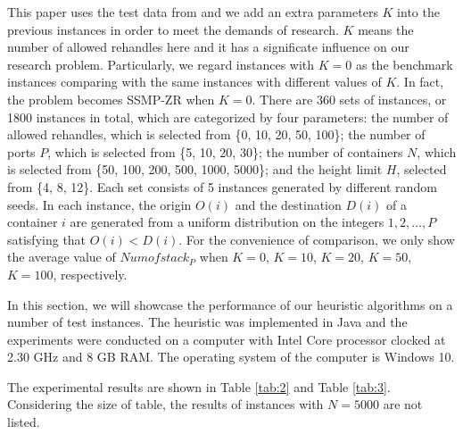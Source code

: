 \documentclass[review,3p,times,authoryear,12pt]{elsarticle}
\begin{document}
This paper uses the test data from \cite{wang2014stowage} and we add an extra parameters $K$ into the previous instances in order to meet the demands of research.
$K$ means the number of allowed rehandles here and it has a significate influence on our research problem.
Particularly, we regard instances with $K=0$ as the benchmark instances comparing with the same instances with different values of $K$.
In fact, the problem becomes SSMP-ZR when $K=0$.
There are 360 sets of instances, or 1800 instances in total, which are categorized by four parameters: the number of allowed rehandles, which is selected from \{0, 10, 20, 50, 100\};
the number of ports $P$, which is selected from \{5, 10, 20, 30\};
the number of containers $N$, which is selected from \{50, 100, 200, 500, 1000, 5000\};
and the height limit $H$, selected from \{4, 8, 12\}.
Each set consists of 5 instances generated by different random seeds.
In each instance, the origin $O(i)$ and the destination $D(i)$ of a container $i$ are generated from a uniform distribution on the integers $1, 2, \ldots, P$ satisfying that $O(i)<D(i)$.
For the convenience of comparison, we only show the average value of $Numofstack_P$ when $K=0$, $K=10$, $K=20$, $K=50$, $K=100$, respectively.

In this section, we will showcase the performance of our heuristic algorithms on a number of test instances.
The heuristic was implemented in Java and the experiments were conducted on a computer with Intel Core processor clocked at 2.30 GHz and 8 GB RAM.
The operating system of the computer is Windows 10.

The experimental results are shown in Table \ref{tab:2} and Table \ref{tab:3}.
Considering the size of table, the results of instances with $N=5000$ are not listed.
\end{document}
